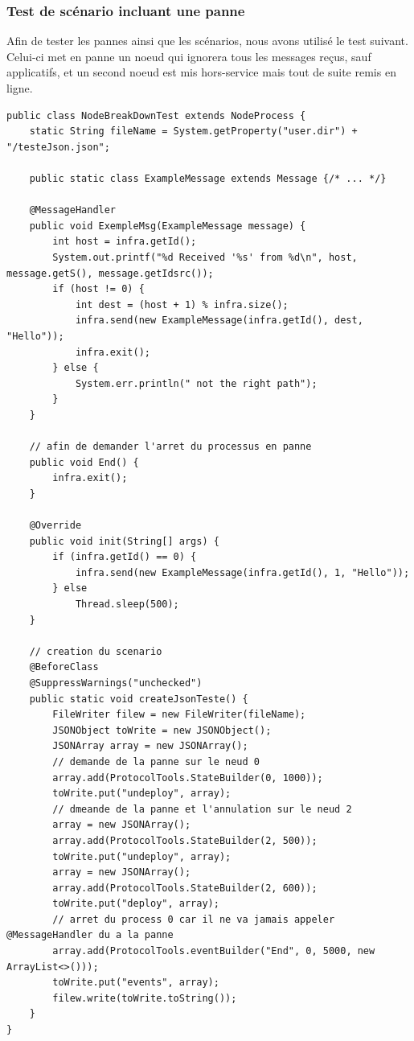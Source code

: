 \documentclass{article}
\begin{document}
			\subsubsection{Test de scénario incluant une panne}
			Afin de tester les pannes ainsi que les scénarios, nous avons utilisé le test suivant. Celui-ci met en panne un noeud qui ignorera tous les messages reçus, sauf applicatifs, et un second noeud est mis hors-service mais tout de suite remis en ligne.
			\begin{lstlisting}
public class NodeBreakDownTest extends NodeProcess {
	static String fileName = System.getProperty("user.dir") + "/testeJson.json";

	public static class ExampleMessage extends Message {/* ... */}

	@MessageHandler
	public void ExempleMsg(ExampleMessage message) {
		int host = infra.getId();
		System.out.printf("%d Received '%s' from %d\n", host, message.getS(), message.getIdsrc());
		if (host != 0) {
			int dest = (host + 1) % infra.size();
			infra.send(new ExampleMessage(infra.getId(), dest, "Hello"));
			infra.exit();
		} else {
			System.err.println(" not the right path");
		}
	}

	// afin de demander l'arret du processus en panne
	public void End() {
		infra.exit();
	}

	@Override
	public void init(String[] args) {
		if (infra.getId() == 0) {
			infra.send(new ExampleMessage(infra.getId(), 1, "Hello"));
		} else
			Thread.sleep(500);
	}

	// creation du scenario
	@BeforeClass
	@SuppressWarnings("unchecked")
	public static void createJsonTeste() {
		FileWriter filew = new FileWriter(fileName);
		JSONObject toWrite = new JSONObject();
		JSONArray array = new JSONArray();
		// demande de la panne sur le neud 0
		array.add(ProtocolTools.StateBuilder(0, 1000));
		toWrite.put("undeploy", array);
		// dmeande de la panne et l'annulation sur le neud 2
		array = new JSONArray();
		array.add(ProtocolTools.StateBuilder(2, 500));
		toWrite.put("undeploy", array);
		array = new JSONArray();
		array.add(ProtocolTools.StateBuilder(2, 600));
		toWrite.put("deploy", array);
		// arret du process 0 car il ne va jamais appeler @MessageHandler du a la panne
		array.add(ProtocolTools.eventBuilder("End", 0, 5000, new ArrayList<>()));
		toWrite.put("events", array);
		filew.write(toWrite.toString());
	}
}
		\end{lstlisting}
\end{document}
